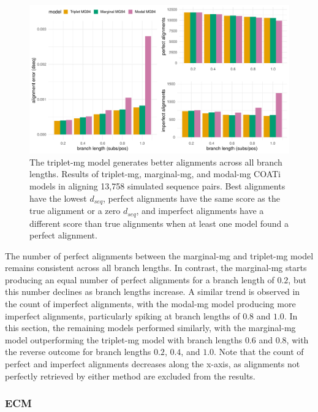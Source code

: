 \begin{figure}[!ht]
\centering
\includegraphics[width=\linewidth]{chapter3/figures/results/results_marginal_triplet_mg.pdf}
 \vspace{1mm}
 \caption[Alignment Accuracy of the Triplet and Approximate MG94 Models]{The triplet-mg model generates better alignments across all branch lengths. Results of triplet-mg, marginal-mg, and modal-mg COATi models in aligning 13,758 simulated sequence pairs. Best alignments have the lowest $d_{seq}$, perfect alignments have the same score as the true alignment or a zero $d_{seq}$, and imperfect alignments have a different score than true alignments when at least one model found a perfect alignment.}
 \label{fig:results_tri_mar_mg}
\end{figure}

The number of perfect alignments between the marginal-mg and triplet-mg model remains consistent across all branch lengths. In contrast, the marginal-mg starts producing an equal number of perfect alignments for a branch length of $0.2$, but this number declines as branch lengths increase. A similar trend is observed in the count of imperfect alignments, with the modal-mg model producing more imperfect alignments, particularly spiking at branch lengths of $0.8$ and $1.0$. In this section, the remaining models performed similarly, with the marginal-mg model outperforming the triplet-mg model with branch lengths $0.6$ and $0.8$, with the reverse outcome for branch lengths $0.2$, $0.4$, and $1.0$. Note that the count of perfect and imperfect alignments decreases along the x-axis, as alignments not perfectly retrieved by either method are excluded from the results.

\subsubsection{ECM}

